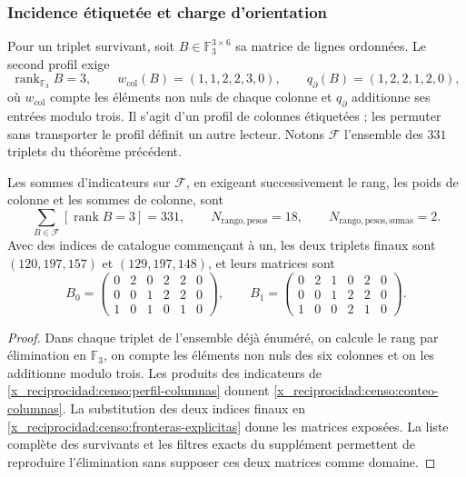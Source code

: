 \subsubsection{Incidence étiquetée et charge d'orientation}

Pour un triplet survivant, soit \(B\in\mathbb F_3^{3\times6}\) sa
matrice de lignes ordonnées. Le second profil exige
\begin{equation}
 \operatorname{rank}_{\mathbb F_3}B=3,\qquad
 w_{\mathrm{col}}(B)=(1,1,2,2,3,0),\qquad
 q_{\partial}(B)=(1,2,2,1,2,0),
 \label{x_reciprocidad:censo:perfil-columnas}
\end{equation}
où \(w_{\mathrm{col}}\) compte les éléments non nuls de chaque
colonne et \(q_{\partial}\) additionne ses entrées modulo trois. Il s'agit d'un profil
de colonnes étiquetées ; les permuter sans transporter le profil définit un autre
lecteur. Notons \(\mathcal F\) l'ensemble des \(331\) triplets
du théorème précédent.

\begin{proposition}
\label{x_reciprocidad:censo:dos-matrices}
Les sommes d'indicateurs sur \(\mathcal F\), en exigeant successivement
le rang, les poids de colonne et les sommes de colonne, sont
\begin{equation}
 \sum_{B\in\mathcal F}[\operatorname{rank}B=3]=331,
 \qquad N_{\mathrm{rango,pesos}}=18,
 \qquad N_{\mathrm{rango,pesos,sumas}}=2.
 \label{x_reciprocidad:censo:conteo-columnas}
\end{equation}
Avec des indices de catalogue commençant à un, les deux triplets finaux sont
\((120,197,157)\) et \((129,197,148)\), et leurs matrices sont
\[
 B_0=\begin{pmatrix}0&2&0&2&2&0\\0&0&1&2&2&0\\1&0&1&0&1&0\end{pmatrix},
 \qquad
 B_1=\begin{pmatrix}0&2&1&0&2&0\\0&0&1&2&2&0\\1&0&0&2&1&0\end{pmatrix}.
\]
\end{proposition}
\begin{proof}
Dans chaque triplet de l'ensemble déjà énuméré, on calcule le rang par élimination en \(\mathbb F_3\), on compte les éléments non nuls des six colonnes et on les additionne modulo trois. Les produits des indicateurs de \eqref{x_reciprocidad:censo:perfil-columnas} donnent \eqref{x_reciprocidad:censo:conteo-columnas}.
La substitution des deux indices finaux en
\eqref{x_reciprocidad:censo:fronteras-explicitas} donne les matrices exposées. La liste
complète des survivants et les filtres exacts du supplément permettent
de reproduire l'élimination sans supposer ces deux matrices comme domaine.
\end{proof}

